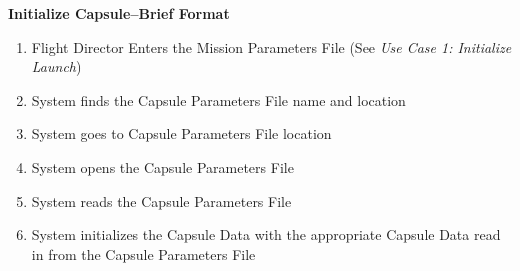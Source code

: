 \documentclass[letterpaper]{article}
\begin{document}
\noindent
\textbf{Initialize Capsule--Brief Format}
\begin{enumerate}
   \item Flight Director Enters the Mission Parameters File (See 
      \textit{Use Case 1:  Initialize Launch})
   \item System finds the Capsule Parameters File name and location
   \item System goes to Capsule Parameters File location
   \item System opens the Capsule Parameters File
   \item System reads the Capsule Parameters File
   \item System initializes the Capsule Data with the appropriate
      Capsule Data read in from the Capsule Parameters File
\end{enumerate}
\end{document}
